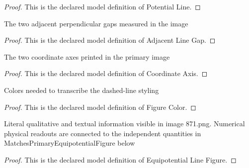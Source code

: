\begin{proof}
  This is the declared model definition of Potential Line.
\end{proof}
\begin{definition}
  \label{def:physics:phyx-mini-0871:phyxminiproblems-problemphyxmini0871-adjacentlinegap}
  The two adjacent perpendicular gaps measured in the image
\end{definition}
\begin{proof}
  This is the declared model definition of Adjacent Line Gap.
\end{proof}
\begin{definition}
  \label{def:physics:phyx-mini-0871:phyxminiproblems-problemphyxmini0871-coordinateaxis}
  The two coordinate axes printed in the primary image
\end{definition}
\begin{proof}
  This is the declared model definition of Coordinate Axis.
\end{proof}
\begin{definition}
  \label{def:physics:phyx-mini-0871:phyxminiproblems-problemphyxmini0871-figurecolor}
  Colors needed to transcribe the dashed-line styling
\end{definition}
\begin{proof}
  This is the declared model definition of Figure Color.
\end{proof}
\begin{definition}
  \label{def:physics:phyx-mini-0871:phyxminiproblems-problemphyxmini0871-equipotentiallinefigure}
  Literal qualitative and textual information visible in image 871.png. Numerical physical readouts are connected to the independent quantities in MatchesPrimaryEquipotentialFigure below
\end{definition}
\begin{proof}
  This is the declared model definition of Equipotential Line Figure.
\end{proof}
